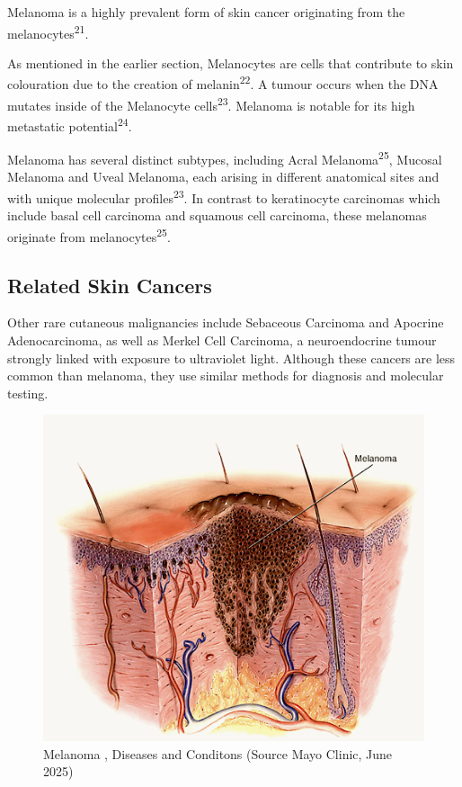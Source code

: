 \documentclass[
]{article}
\begin{document}
Melanoma is a highly prevalent form of skin cancer originating from the
melanocytes\textsuperscript{21}.

As mentioned in the earlier section, Melanocytes are cells that
contribute to skin colouration due to the creation of
melanin\textsuperscript{22}. A tumour occurs when the DNA mutates inside
of the Melanocyte cells\textsuperscript{23}. Melanoma is notable for its
high metastatic potential\textsuperscript{24}.

Melanoma has several distinct subtypes, including Acral
Melanoma\textsuperscript{25}, Mucosal Melanoma and Uveal Melanoma, each
arising in different anatomical sites and with unique molecular
profiles\textsuperscript{23}. In contrast to keratinocyte carcinomas
which include basal cell carcinoma and squamous cell carcinoma, these
melanomas originate from melanocytes\textsuperscript{25}.

\subsection{Related Skin Cancers}\label{related-skin-cancers}

Other rare cutaneous malignancies include Sebaceous Carcinoma and
Apocrine Adenocarcinoma, as well as Merkel Cell Carcinoma, a
neuroendocrine tumour strongly linked with exposure to ultraviolet
light. Although these cancers are less common than melanoma, they use
similar methods for diagnosis and molecular testing.

\begin{figure}

{\centering \includegraphics[width=0.9\linewidth]{Images/melanoma} 

}

\caption{Melanoma , Diseases and Conditons (Source Mayo Clinic, June 2025)}\label{fig:unnamed-chunk-12}
\end{figure}
\end{document}
